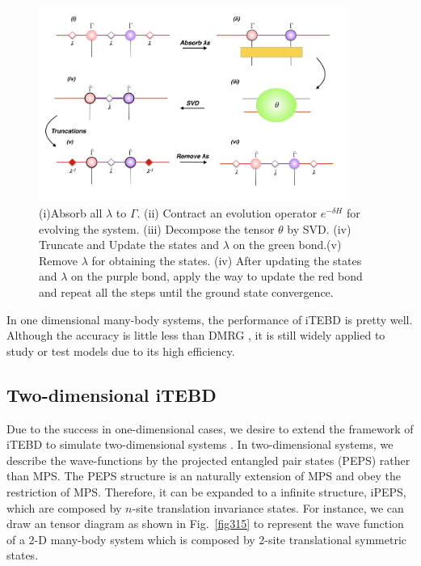 \begin{figure}[ht]
	\centering
	\includegraphics[width=0.90\textwidth]{figures/fig313.png}
	\caption[The tensor network diagrams for the 1-D iTEBD]{ (i)Absorb all $\lambda$ to $\Gamma$. (ii) Contract an evolution operator $e^{-\delta H}$ for evolving the system. (iii) Decompose the tensor $\theta$ by SVD. (iv) Truncate and Update the states and $\lambda$ on the green bond.(v) Remove $
		\lambda$ for obtaining the states. (iv) After updating the states and $\lambda$ on the purple bond, apply the way to update the red bond and repeat all the steps until the ground state convergence.}
	\label{fig314}
\end{figure}

In one dimensional many-body systems, the performance of iTEBD is pretty well. Although the accuracy is little less than DMRG \cite{PhysRevB.48.10345}, it is still widely applied to study or test models due to its high efficiency.

\subsection{Two-dimensional iTEBD}
\label{2ditebd}

Due to the success in one-dimensional cases, we desire to extend the framework of iTEBD to simulate two-dimensional systems . In two-dimensional systems, we describe the wave-functions by the projected entangled pair states (PEPS) rather than MPS. The PEPS structure is an naturally extension of MPS and obey the restriction of MPS. Therefore, it can be expanded to a infinite structure, iPEPS, which are composed by $n$-site translation invariance states. For instance, we can draw an tensor diagram as shown in Fig.~\ref{fig315} to represent the wave function of a 2-D many-body system which is composed by 2-site translational symmetric states.

